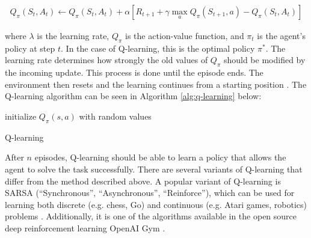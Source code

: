 \begin{align*}
   Q_{\pi}\left(S_{t}, A_{t}\right) \leftarrow Q_{\pi}\left(S_{t}, A_{t}\right)+\alpha\left[R_{t+1}+\gamma \max _{a} Q_{\pi}\left(S_{t+1}, a\right)-Q_{\pi}\left(S_{t}, A_{t}\right)\right]
\end{align*}


where $\lambda$ is the learning rate, $Q_\pi$ is the action-value function, and $\pi_t$ is the agent’s policy at step $t$. In the case of Q-learning, this is the optimal policy $\pi^*$. The learning rate determines how strongly the old values of $Q_\pi$ should be modified by the incoming update. This process is done until the episode ends. The environment then resets and the learning continues from a starting position \cite{sutton2018reinforcement}. The Q-learning algorithm can be seen in Algorithm \ref{alg:q-learning} below:



{\centering
\begin{minipage}{.8\linewidth}
    \begin{algorithm}[H]
      initialize $Q_\pi(s,a)$  with random values\;
      
      \caption{Q-learning}\label{alg:q-learning}
    \end{algorithm}
\end{minipage}
\par
}


After $n$ episodes, Q-learning should be able to learn a policy that allows the agent to solve the task successfully. There are several variants of Q-learning that differ from the method described above. A popular variant of Q-learning is SARSA (“Synchronous”, “Asynchronous”, “Reinforce”), which can be used for learning both discrete (e.g. chess, Go) and continuous (e.g. Atari games, robotics) problems \cite{sutton2018reinforcement}. Additionally, it is one of the algorithms available in the open source deep reinforcement learning OpenAI Gym \cite{openaigym}.

